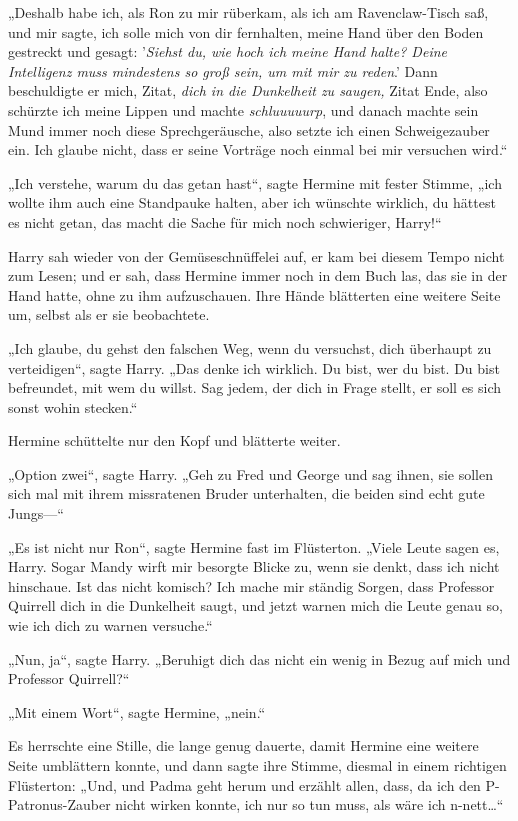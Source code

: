 {„Deshalb habe ich, als Ron zu mir rüberkam, als ich am Ravenclaw-Tisch saß, und mir sagte, ich solle mich von dir fernhalten, meine Hand über den Boden gestreckt und gesagt: '\emph{Siehst du, wie hoch ich meine Hand halte? Deine Intelligenz muss mindestens so groß sein, um mit mir zu reden}.' Dann beschuldigte er mich, Zitat, \emph{dich in die Dunkelheit zu saugen,} Zitat Ende, also schürzte ich meine Lippen und machte \emph{schluuuuurp}, und danach machte sein Mund immer noch diese Sprechgeräusche, also setzte ich einen Schweigezauber ein. Ich glaube nicht, dass er seine Vorträge noch einmal bei mir versuchen wird.“

„Ich verstehe, warum du das getan hast“, sagte Hermine mit fester Stimme, „ich wollte ihm auch eine Standpauke halten, aber ich wünschte wirklich, du hättest es nicht getan, das macht die Sache für mich noch schwieriger, Harry!“

Harry sah wieder von der Gemüseschnüffelei auf, er kam bei diesem Tempo nicht zum Lesen; und er sah, dass Hermine immer noch in dem Buch las, das sie in der Hand hatte, ohne zu ihm aufzuschauen. Ihre Hände blätterten eine weitere Seite um, selbst als er sie beobachtete.

„Ich glaube, du gehst den falschen Weg, wenn du versuchst, dich überhaupt zu verteidigen“, sagte Harry. „Das denke ich wirklich. Du bist, wer du bist. Du bist befreundet, mit wem du willst. Sag jedem, der dich in Frage stellt, er soll es sich sonst wohin stecken.“

Hermine schüttelte nur den Kopf und blätterte weiter.

„Option zwei“, sagte Harry. „Geh zu Fred und George und sag ihnen, sie sollen sich mal mit ihrem missratenen Bruder unterhalten, die beiden sind echt gute Jungs—“

„Es ist nicht nur Ron“, sagte Hermine fast im Flüsterton. „Viele Leute sagen es, Harry. Sogar Mandy wirft mir besorgte Blicke zu, wenn sie denkt, dass ich nicht hinschaue. Ist das nicht komisch? Ich mache mir ständig Sorgen, dass Professor Quirrell dich in die Dunkelheit saugt, und jetzt warnen mich die Leute genau so, wie ich dich zu warnen versuche.“

„Nun, ja“, sagte Harry. „Beruhigt dich das nicht ein wenig in Bezug auf mich und Professor Quirrell?“

„Mit einem Wort“, sagte Hermine, „nein.“

Es herrschte eine Stille, die lange genug dauerte, damit Hermine eine weitere Seite umblättern konnte, und dann sagte ihre Stimme, diesmal in einem richtigen Flüsterton: „Und, und Padma geht herum und erzählt allen, dass, da ich den P-Patronus-Zauber nicht wirken konnte, ich nur so tun muss, als wäre ich n-nett…“

}
